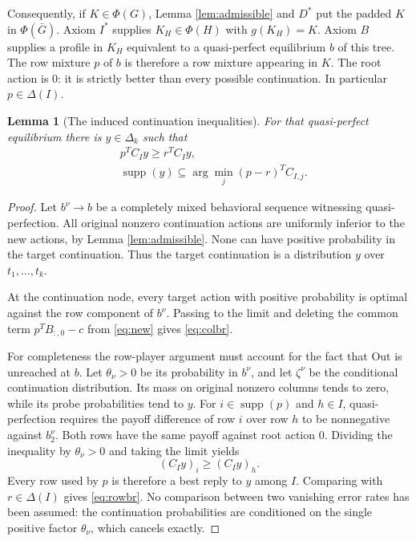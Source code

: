 \documentclass[11pt]{article}
\newcommand{\supp}{\operatorname{supp}}
\newtheorem{lemma}[theorem]{Lemma}
\theoremstyle{definition}
\theoremstyle{remark}
\begin{document}
Consequently, if $K\in\Phi(G)$, Lemma \ref{lem:admissible} and $D^*$
put the padded $K$ in $\Phi(\bar G)$. Axiom $I^*$ supplies
$K_H\in\Phi(H)$ with $g(K_H)=K$. Axiom $B$ supplies a profile in
$K_H$ equivalent to a quasi-perfect equilibrium $b$ of this tree.
The row mixture $p$ of $b$ is therefore a row mixture appearing in
$K$. The root action is $0$: it is strictly better than every possible
continuation. In particular $p\in\Delta(I)$.

\begin{lemma}[The induced continuation inequalities]\label{lem:continuation}
For that quasi-perfect equilibrium there is $y\in\Delta_k$ such that
\begin{align}
 &p^TC_Iy\ge r^TC_Iy,\label{eq:rowbr}\\
 &\supp(y)\subseteq
       \arg\min_j (p-r)^TC_{I,j}.\label{eq:colbr}
\end{align}
\end{lemma}
\begin{proof}
Let $b^\nu\to b$ be a completely mixed behavioral sequence witnessing
quasi-perfection. All original nonzero continuation actions are uniformly
inferior to the new actions, by Lemma \ref{lem:admissible}. None can have
positive probability in the target continuation. Thus the target
continuation is a distribution $y$ over $t_1,\ldots,t_k$.

At the continuation node, every target action with positive probability
is optimal against the row component of $b^\nu$. Passing to the limit
and deleting the common term $p^TB_{:,0}-c$ from \eqref{eq:new} gives
\eqref{eq:colbr}.

For completeness the row-player argument must account for the fact that
Out is unreached at $b$. Let $\theta_\nu>0$ be its probability in
$b^\nu$, and let $\zeta^\nu$ be the conditional continuation distribution.
Its mass on original nonzero columns tends to zero, while its probe
probabilities tend to $y$. For $i\in\supp(p)$ and $h\in I$,
quasi-perfection requires the payoff difference of row $i$ over row $h$
to be nonnegative against $b_2^\nu$. Both rows have the same payoff
against root action $0$. Dividing the inequality by $\theta_\nu>0$
and taking the limit yields
\[
 (C_Iy)_i\ge(C_Iy)_h.
\]
Every row used by $p$ is therefore a best reply to $y$ among $I$.
Comparing with $r\in\Delta(I)$ gives \eqref{eq:rowbr}. No comparison
between two vanishing error rates has been assumed: the continuation
probabilities are conditioned on the single positive factor
$\theta_\nu$, which cancels exactly.
\end{proof}
\end{document}
